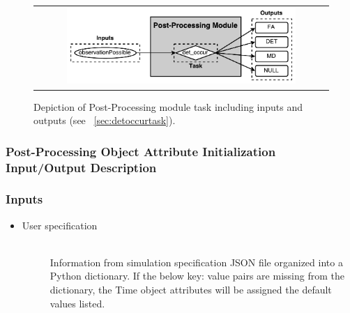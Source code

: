 \documentclass[cleanfoot]{asme2ej}
\begin{document}
\begin{figure}[ht]
    \begin{center}
        \begin{tabular}{c}
             \includegraphics[width=0.8\textwidth]{PostTasks}
        \end{tabular}
    \end{center}
    \caption{\label{fig:postprocessingmodule} Depiction of Post-Processing module task including inputs and outputs (see ~\ref{sec:detoccurtask}).}
\end{figure}

\subsubsection{Post-Processing Object Attribute Initialization Input/Output Description}
\subsubsection*{Inputs}
\begin{itemize}
    \item 
    \begin{description}
        \item[User specification] \hfill \\
        Information from simulation specification JSON file organized into a Python dictionary. If the below key: value pairs are missing from the dictionary, the Time object attributes will be assigned the default values listed.
    \end{description}
\end{itemize}
\end{document}
